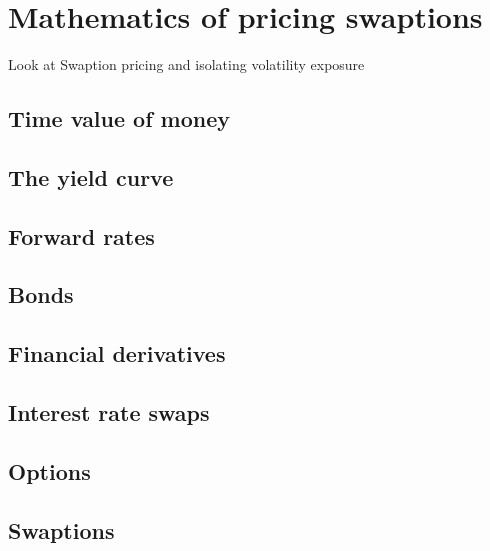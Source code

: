 \section{Mathematics of pricing swaptions}

Look at Swaption pricing and isolating volatility exposure

\subsection{Time value of money}

\subsection{The yield curve}

\subsection{Forward rates}

\subsection{Bonds}

\subsection{Financial derivatives}

\subsection{Interest rate swaps}

\subsection{Options}

\subsection{Swaptions}
